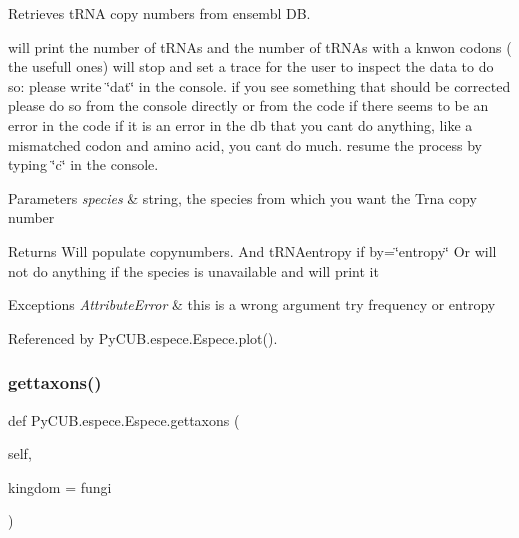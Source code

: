 Retrieves t\+R\+NA copy numbers from ensembl DB. 

will print the number of t\+R\+N\+As and the number of t\+R\+N\+As with a knwon codons ( the usefull ones) will stop and set a trace for the user to inspect the data to do so\+: please write \char`\"{}dat\char`\"{} in the console. if you see something that should be corrected please do so from the console directly or from the code if there seems to be an error in the code if it is an error in the db that you can\textquotesingle{}t do anything, like a mismatched codon and amino acid, you can\textquotesingle{}t do much. resume the process by typing \char`\"{}c\char`\"{} in the console.


\begin{DoxyParams}{Parameters}
{\em species} & string, the species from which you want the Trna copy number\\
\hline
\end{DoxyParams}
\begin{DoxyReturn}{Returns}
Will populate copynumbers. And t\+R\+N\+Aentropy if by=\char`\"{}entropy\char`\"{} Or will not do anything if the species is unavailable and will print it
\end{DoxyReturn}

\begin{DoxyExceptions}{Exceptions}
{\em Attribute\+Error} & this is a wrong argument try frequency or entropy \\
\hline
\end{DoxyExceptions}


Referenced by Py\+C\+U\+B.\+espece.\+Espece.\+plot().

\mbox{\label{class_py_c_u_b_1_1espece_1_1_espece_af716fcd7e7e34e12cd7786469d695422}} 
\subsubsection{\texorpdfstring{gettaxons()}{gettaxons()}}
{\footnotesize\ttfamily def Py\+C\+U\+B.\+espece.\+Espece.\+gettaxons (\begin{DoxyParamCaption}\item[{}]{self,  }\item[{}]{kingdom = {\ttfamily \textquotesingle{}fungi\textquotesingle{}} }\end{DoxyParamCaption})}



